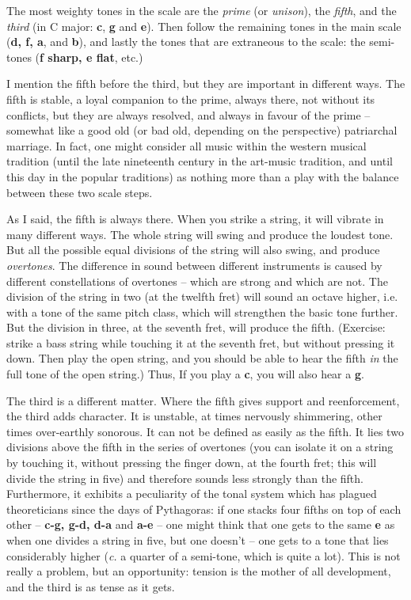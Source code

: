 The most weighty tones in the scale are the \emph{prime} (or
\emph{unison}), the \emph{fifth}, and the \emph{third} (in C major:
\textbf{c}, \textbf{g} and \textbf{e}). Then follow the remaining
tones in the main scale (\textbf{d, f, a}, and \textbf{b}), and lastly
the tones that are extraneous to the scale: the semi-tones (\textbf{f
sharp, e flat}, etc.)

I mention the fifth before the third, but they are important in
different ways. The fifth is stable, a loyal companion to the prime,
always there, not without its conflicts, but they are always resolved,
and always in favour of the prime -- somewhat like a good old (or bad
old, depending on the perspective) patriarchal marriage. In fact, one
might consider all music within the western musical tradition (until
the late nineteenth century in the art-music tradition, and until this
day in the popular traditions) as nothing more than a play with the
balance between these two scale steps.

As I said, the fifth is always there. When you strike a string, it
will vibrate in many different ways. The whole string will swing and
produce the loudest tone. But all the possible equal divisions of the
string will also swing, and produce \emph{overtones}. The difference
in sound between different instruments is caused by different
constellations of overtones -- which are strong and which are not. The
division of the string in two (at the twelfth fret) will sound an
octave higher, i.e. with a tone of the same pitch class, which will
strengthen the basic tone further. But the division in three, at the
seventh fret, will produce the fifth. (Exercise: strike a bass string
while touching it at the seventh fret, but without pressing it
down. Then play the open string, and you should be able to hear the
fifth \emph{in} the full tone of the open string.) Thus, If you play a
\textbf{c}, you will also hear a \textbf{g}.

The third is a different matter. Where the fifth gives support and
reenforcement, the third adds character. It is unstable, at times
nervously shimmering, other times over-earthly sonorous. It can not be
defined as easily as the fifth. It lies two divisions above the fifth
in the series of overtones (you can isolate it on a string by touching it,
without pressing the finger down, at the fourth fret; this will divide the string
in five) and therefore sounds less strongly than the
fifth. Furthermore, it exhibits a peculiarity of the tonal system
which has plagued theoreticians since the days of Pythagoras: if one
stacks four fifths on top of each other -- \textbf{c-g, g-d, d-a} and
\textbf{a-e} -- one might think that one gets to the same
\textbf{e} as when one divides a string in five, but one doesn't --
one gets to a tone that lies considerably higher (\emph{c.} a quarter
of a semi-tone, which is quite a lot). This is not really a problem,
but an opportunity: tension is the mother of all development, and the
third is as tense as it gets.

